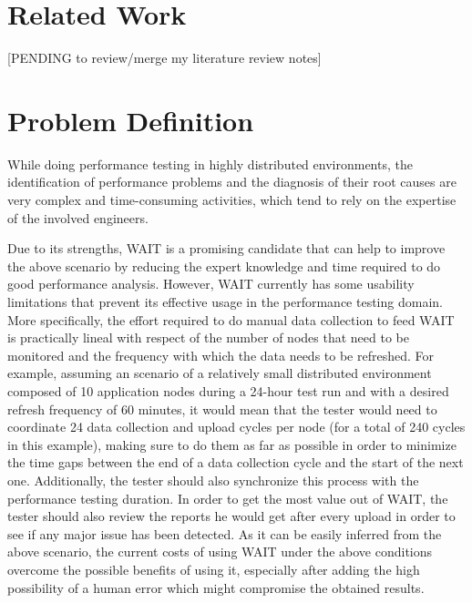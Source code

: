 \documentclass[runningheads,a4paper]{llncs}
\begin{document}

\section{Related Work}

[PENDING to review/merge my literature review notes]



\section{Problem Definition}

While doing performance testing in highly distributed environments, the
identification of performance problems and the diagnosis of their root causes are very complex and time-consuming
activities, which tend to rely on the expertise of the involved engineers.

Due to its strengths, WAIT is a promising candidate that can help to improve the
above scenario by reducing the expert knowledge and time required to do good
performance analysis. However, WAIT currently has some usability limitations
that prevent its effective usage in the performance testing domain. More
specifically, the effort required to do manual data collection to feed WAIT is
practically lineal with respect of the number of nodes that need to be monitored
and the frequency with which the data needs to be refreshed. For example,
assuming an scenario of a relatively small distributed environment composed
of 10 application nodes during a 24-hour test run and with a desired refresh
frequency of 60 minutes, it would mean that the tester would need to coordinate 
24 data collection and upload cycles per node (for a total of 240
cycles in this example), making sure to do them as far as possible in order to
minimize the time gaps between the end of a data collection cycle and the
start of the next one. Additionally, the tester should also synchronize this
process with the performance testing duration. In order to get the most value
out of WAIT, the tester should also review the reports he would get after every 
upload in order to see if any major issue has been detected. As it can be easily inferred from
the above scenario, the current costs of using WAIT under the above conditions
overcome the possible benefits of using it, especially after adding the high
possibility of a human error which might compromise the obtained results.
\end{document}
